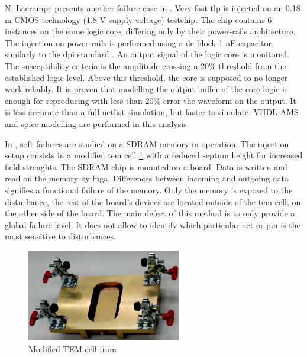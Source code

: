 N. Lacrampe presents another failure case in \cite{LacrampeTransientImmunity}.
Very-fast \gls{tlp} is injected on an 0.18 \textmu{}m CMOS technology (1.8 V supply voltage) testchip.
The chip contains 6 instances on the same logic core, differing only by their power-rails architecture.
The injection on power rails is performed using a \gls{dc} block 1 nF capacitor, similarly to the \gls{dpi} standard \cite{iec62132-4}.
An output signal of the logic core is monitored.
The susceptibility criteria is the amplitude crossing a 20\% threshold from the established logic level.
Above this threshold, the core is supposed to no longer work reliably.
It is proven that modelling the output buffer of the core logic is enough for reproducing with less than 20\% error the waveform on the output.
It is less accurate than a full-netlist simulation, but faster to simulate.
VHDL-AMS and \gls{spice} modelling are performed in this analysis.

In \cite{SDRAMCase}, soft-failures are studied on a SDRAM memory in operation.
The injection setup consists in a modified \gls{tem} cell \ref{fig:modified-tem-cell} with a reduced septum height for increased field strenghts.
The SDRAM chip is mounted on a board.
Data is written and read on the memory by \gls{fpga}.
Differences between incoming and outgoing data signifies a functional failure of the memory.
Only the memory is exposed to the disturbance, the rest of the board's devices are located outside of the \gls{tem} cell, on the other side of the board.
The main defect of this method is to only provide a global failure level.
It does not allow to identify which particular net or pin is the most sensitive to disturbances.

\begin{figure}[!h]
  \centering
  \includegraphics[width=0.6\textwidth]{src/1/figures/modified_tem_cell.png}
  \caption{Modified TEM cell from \cite{SDRAMCase}}
  \label{fig:modified-tem-cell}
\end{figure}

